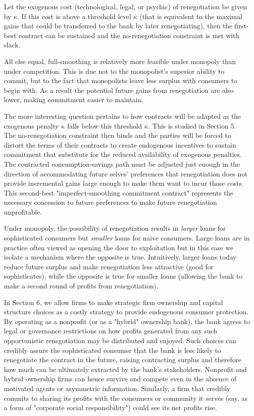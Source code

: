 \documentclass[11pt,english]{article}
\theoremstyle{plain}
\theoremstyle{definition}
\begin{document}
Let the exogenous cost (technological, legal, or psychic) of renegotiation be given by $\kappa$. If this cost is above a threshold level $\bar{\kappa}$ (that is equivalent to the maximal gains that could be transferred to the bank by later renegotiating), then the first-best contract can be sustained and the no-renegotiation constraint is met with slack. 

All else equal, full-smoothing is relatively more feasible under monopoly than under competition. This is due not to the monopolist's superior ability to commit, but to the fact that monopolists leave less surplus with consumers to begin with. As a result the potential future gains from renegotiation are also lower, making commitment easier to maintain.

The more interesting question pertains to how contracts will be adapted as the exogenous penalty $\kappa$ falls below this threshold $\bar{\kappa}$. This is studied in Section 5. The no-renegotiation constraint then binds and the parties will be forced to distort the terms of their contracts to create endogenous incentives to sustain commitment that substitute for the reduced availability of exogenous penalties. The contracted consumption-savings path must be adjusted just enough in the direction of accommodating future selves' preferences that renegotiation does not provide incremental gains large enough to make them want to incur those costs. This second-best "imperfect-smoothing commitment contract" represents the necessary concession to future preferences to make future renegotiation unprofitable.

Under monopoly, the possibility of renegotiation results in \emph{larger} loans for sophisticated consumers but \emph{smaller} loans for naive consumers. Large loans are in practice often viewed as opening the door to exploitation but in this case we isolate a
mechanism where the opposite is true. Intuitively, larger loans today reduce future surplus and make renegotiation less attractive (good for sophisticates), while the opposite is true for smaller loans (allowing the bank to make a second round of profits from renegotiation). 

In Section 6, we allow firms to make strategic firm ownership and capital structure choices as a costly strategy to provide endogenous consumer protection. By operating as a nonprofit (or as a "hybrid" ownership bank), the bank agrees to legal or governance restrictions on how profits generated from any such opportunistic renegotiation may be distributed and enjoyed. Such choices can credibly assure the sophisticated consumer that the bank is less likely to renegotiate the contract in the future, raising contracting surplus and therefore how much can be ultimately extracted by the bank's stakeholders. Nonprofit and hybrid ownership firms can hence survive and compete even in the absence of motivated agents or asymmetric information. Similarly, a firm that credibly commits to sharing its profits with the consumers or community it serves (say, as a form of "corporate social responsibility") could see its net profits rise.
\end{document}
